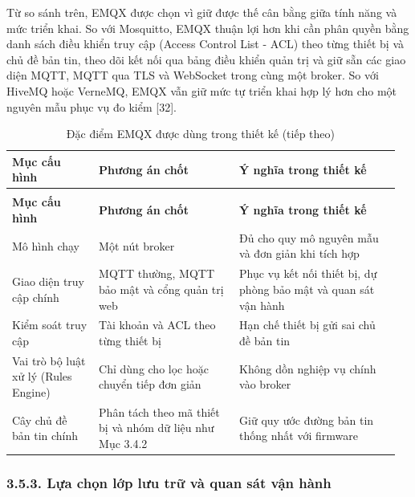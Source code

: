 \documentclass[a4paper]{extarticle}
\newcommand{\thesissettableid}[2]{%
  \renewcommand{\thetable}{#1}%
  \renewcommand{\theHtable}{#2}%
}
\begin{document}
Từ so sánh trên, EMQX được chọn vì giữ được thế cân bằng giữa tính năng và mức triển khai. So với
Mosquitto, EMQX thuận lợi hơn khi cần phân quyền bằng danh sách điều khiển truy cập
(Access Control List - ACL) theo từng thiết bị và chủ đề bản tin, theo dõi kết nối qua bảng điều khiển quản trị
và giữ sẵn các giao diện MQTT, MQTT qua TLS và WebSocket trong cùng một broker. So với HiveMQ
hoặc VerneMQ, EMQX vẫn giữ mức tự triển khai hợp lý hơn cho một nguyên mẫu phục
vụ đo kiểm {[}32{]}.

{\thesissettableid{3.24}{condensed-bang-3-24-dac-diem-emqx-duoc-dung-trong-thiet-ke}
\def\LTcaptype{table}
\begin{longtable}{|L{0.212\linewidth}|L{0.347\linewidth}|L{0.399\linewidth}|}
\caption{Đặc điểm EMQX được dùng trong thiết kế}\label{tab:condensed-bang-3-24-dac-diem-emqx-duoc-dung-trong-thiet-ke}\\
\hline
\textbf{Mục cấu hình} & \textbf{Phương án chốt} & \textbf{Ý nghĩa trong thiết kế} \\
\hline
\endfirsthead
\caption[]{Đặc điểm EMQX được dùng trong thiết kế (tiếp theo)}\\
\hline
\textbf{Mục cấu hình} & \textbf{Phương án chốt} & \textbf{Ý nghĩa trong thiết kế} \\
\hline
\endhead
\endfoot
\endlastfoot
Mô hình chạy & Một nút broker & Đủ cho quy mô nguyên mẫu và đơn giản khi tích hợp \\\hline
Giao diện truy cập chính & MQTT thường, MQTT bảo mật và cổng quản trị web & Phục vụ kết nối thiết bị, dự phòng bảo mật và quan sát vận hành \\\hline
Kiểm soát truy cập & Tài khoản và ACL theo từng thiết bị & Hạn chế thiết bị gửi sai chủ đề bản tin \\\hline
Vai trò bộ luật xử lý (Rules Engine) & Chỉ dùng cho lọc hoặc chuyển tiếp đơn giản & Không dồn nghiệp vụ chính vào broker \\\hline
Cây chủ đề bản tin chính & Phân tách theo mã thiết bị và nhóm dữ liệu như Mục 3.4.2 & Giữ quy ước đường bản tin thống nhất với firmware \\\hline
\end{longtable}
}

\subsubsection{3.5.3. Lựa chọn lớp lưu trữ và quan sát vận hành}\label{lux1ef1a-chux1ecdn-lux1edbp-lux1b0u-trux1eef-vuxe0-quan-suxe1t-vux1eadn-huxe0nh}
\end{document}
